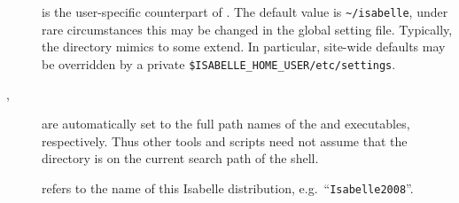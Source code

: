 \begin{isabellebody}
\begin{isamarkuptext}
\begin{description}
  \item[\hypertarget{setting.ISABELLE-HOME-USER}{\hyperlink{setting.ISABELLE-HOME-USER}{\mbox{}}}] is the user-specific
  counterpart of \hyperlink{setting.ISABELLE-HOME}{\mbox{}}. The default value is
  \verb|~/isabelle|, under rare circumstances this may be
  changed in the global setting file.  Typically, the \hyperlink{setting.ISABELLE-HOME-USER}{\mbox{}} directory mimics \hyperlink{setting.ISABELLE-HOME}{\mbox{}} to
  some extend. In particular, site-wide defaults may be overridden by
  a private \verb|$ISABELLE_HOME_USER/etc/settings|.
  
  \item[\hypertarget{setting.ISABELLE-PROCESS}{\hyperlink{setting.ISABELLE-PROCESS}{\mbox{}}}\isa{{\isachardoublequote}\isactrlsup {\isacharasterisk}{\isachardoublequote}}, \hyperlink{setting.ISABELLE-TOOL}{\mbox{}}\isa{{\isachardoublequote}\isactrlsup {\isacharasterisk}{\isachardoublequote}}] are automatically set to the full path
  names of the \hyperlink{executable.isabelle-process}{\mbox{}} and \hyperlink{executable.isabelle}{\mbox{}} executables, respectively.  Thus other tools and scripts
  need not assume that the \hyperlink{file.$ISABELLE-HOME/bin}{\mbox{}} directory is
  on the current search path of the shell.
  
  \item[\hypertarget{setting.ISABELLE-IDENTIFIER}{\hyperlink{setting.ISABELLE-IDENTIFIER}{\mbox{}}}\isa{{\isachardoublequote}\isactrlsup {\isacharasterisk}{\isachardoublequote}}] refers
  to the name of this Isabelle distribution, e.g.\ ``\verb|Isabelle2008|''.


\end{description}
\end{isamarkuptext}
\end{isabellebody}
